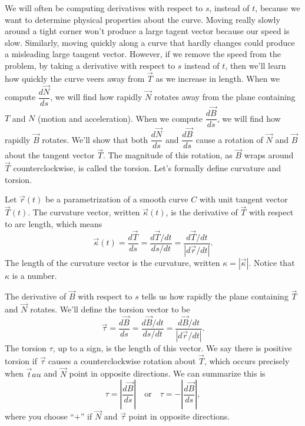 We will often be computing derivatives with respect to $s$, instead of $t$, because we want to determine physical properties about the curve. Moving really slowly around a tight corner won't produce a large tagent vector because our speed is slow.  Similarly, moving quickly along a curve that hardly changes could produce a misleading large tangent vector.  However, if we remove the speed from the problem, by taking a derivative with respect to $s$ instead of $t$, then we'll learn how quickly the curve veers away from $\vec T$ as we increase in length.  
When we compute $\dfrac{d\vec N}{ds}$, we will find how rapidly $\vec N$ rotates away from the plane containing $T$ and $N$ (motion and acceleration). 
When we compute $\dfrac{d\vec B}{ds}$, we will find how rapidly $\vec B$ rotates.  We'll show that both $\dfrac{d\vec N}{ds}$ and $\dfrac{d\vec B}{ds}$ cause a rotation of $\vec N$ and $\vec B$ about the tangent vector $\vec T$. The magnitude of this rotation, as $\vec B$ wraps around $\vec T$ counterclockwise, is called the torsion. Let's formally define curvature and torsion.

\begin{definition}
 Let $\vec r(t)$ be a parametrization of a smooth curve $C$ with unit tangent vector $\vec T(t)$.  The curvature vector, written $\vec \kappa(t)$, is the derivative of $\vec T$ with respect to arc length, which means 
 $$\vec \kappa(t)=\dfrac{d\vec T}{ds}=\dfrac{d\vec T/dt}{ds/dt}=\dfrac{d\vec T/dt}{|d\vec r/dt|}.$$ 
 The length of the curvature vector is the curvature, written $\kappa = |\vec\kappa|$. Notice that $\kappa$ is a number.

 The derivative of $\vec B$ with respect to $s$ tells us how rapidly the plane containing $\vec T$ and $\vec N$ rotates. We'll define the torsion vector to be 
%
 $$\vec \tau = \dfrac{d\vec B}{ds} = \dfrac{d\vec B/dt}{ds/dt}=\dfrac{d\vec B/dt}{|d\vec r/dt|}.$$ 
 The torsion $\tau$, up to a sign, is the length of this vector. We say there is positive torsion if $\vec \tau$ causes a counterclockwise rotation about $\vec T$, which occurs precisely when $\vec tau$ and $\vec N$ point in opposite directions. We can summarize this is $$\tau=\left|\dfrac{d\vec B}{ds}\right|\quad \text{or}\quad \tau=-\left|\dfrac{d\vec B}{ds}\right|,$$ where you choose ``$+$'' if $\vec N$ and $\vec \tau$ point in opposite directions. 
\end{definition}


